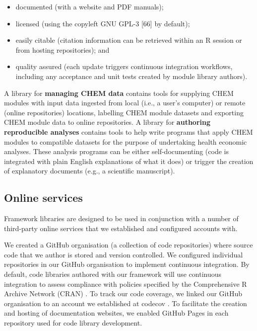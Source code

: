 \documentclass[sn-vancouver,Numbered,pdflatex]{sn-jnl}
\theoremstyle{remark}
\theoremstyle{definition}
\begin{document}
\begin{itemize}
\item
  documented (with a website and PDF manuals);
\item
  licensed (using the copyleft GNU GPL-3 {[}66{]} by default);
\item
  easily citable (citation information can be retrieved within an R session or from hosting repositories); and
\item
  quality assured (each update triggers continuous integration workflows, including any acceptance and unit tests created by module library authors).
\end{itemize}

A library for \textbf{managing CHEM data} contains tools for supplying CHEM modules with input data ingested from local (i.e., a user's computer) or remote (online repositories) locations, labelling CHEM module datasets and exporting CHEM module data to online repositories. A library for \textbf{authoring reproducible analyses} contains tools to help write programs that apply CHEM modules to compatible datasets for the purpose of undertaking health economic analyses. These analysis programs can be either self-documenting (code is integrated with plain English explanations of what it does) or trigger the creation of explanatory documents (e.g., a scientific manuscript).

\hypertarget{online-services}{%
\subsection{Online services}\label{online-services}}

Framework libraries are designed to be used in conjunction with a number of third-party online services that we established and configured accounts with.

We created a GitHub organisation (a collection of code repositories) where source code that we author is stored and version controlled. We configured individual repositories in our GitHub organisation to implement continuous integration. By default, code libraries authored with our framework will use continuous integration to assess compliance with policies specified by the Comprehensive R Archive Network (CRAN) \citep{CRAN2022}. To track our code coverage, we linked our GitHub organisation to an account we established at codecov \citep{codecov_2022}. To facilitate the creation and hosting of documentation websites, we enabled GitHub Pages in each repository used for code library development.
\end{document}
